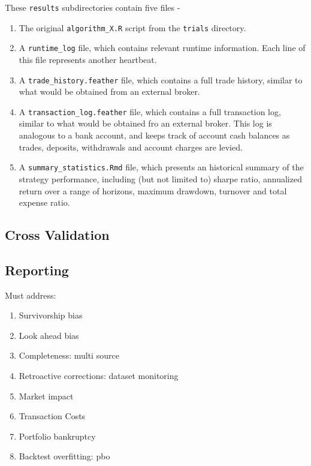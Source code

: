 \documentclass[11pt,preprint, authoryear]{elsarticle}
\numberwithin{equation}{section}
\numberwithin{figure}{section}
\numberwithin{table}{section}
\def\tightlist{} %
\begin{document}
These \texttt{results} subdirectories contain five files -

\begin{enumerate}
\def\labelenumi{\arabic{enumi}.}
\tightlist
\item
  The original \texttt{algorithm\_X.R} script from the \texttt{trials}
  directory.
\item
  A \texttt{runtime\_log} file, which contains relevant runtime
  information. Each line of this file represents another heartbeat.
\item
  A \texttt{trade\_history.feather} file, which contains a full trade
  history, similar to what would be obtained from an external broker.
\item
  A \texttt{transaction\_log.feather} file, which contains a full
  transaction log, similar to what would be obtained fro an external
  broker. This log is analogous to a bank account, and keeps track of
  account cash balances as trades, deposits, withdrawals and account
  charges are levied.
\item
  A \texttt{summary\_statistics.Rmd} file, which presents an historical
  summary of the strategy performance, including (but not limited to)
  sharpe ratio, annualized return over a range of horizons, maximum
  drawdown, turnover and total expense ratio.
\end{enumerate}

\newpage

\subsection{Cross Validation}\label{cross-validation}

\newpage

\subsection{Reporting}\label{reporting}

Must address:

\begin{enumerate}
\def\labelenumi{\arabic{enumi}.}
\item
  Survivorship bias
\item
  Look ahead bias
\item
  Completeness: multi source
\item
  Retroactive corrections: dataset monitoring
\item
  Market impact
\item
  Transaction Costs
\item
  Portfolio bankruptcy
\item
  Backtest overfitting: pbo
\end{enumerate}
\end{document}
